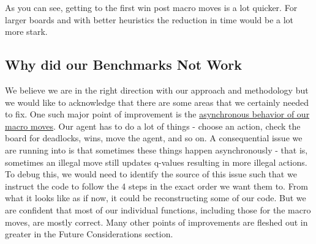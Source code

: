 \documentclass{article}
\begin{document}
As you can see, getting to the first win post macro moves is a lot quicker. For larger boards and with better heuristics the reduction in time would be a lot more stark. 

\subsection{Why did our Benchmarks Not Work}

We believe we are in the right direction with our approach and methodology but we would like to acknowledge that there are some areas that we certainly needed to fix. One such major point of improvement is the \underline{asynchronous behavior of our macro moves}. Our agent has to do a lot of things - choose an action, check the board for deadlocks, wins, move the agent, and so on. A consequential issue we are running into is that sometimes these things happen asynchronously - that is, sometimes an illegal move still updates q-values resulting in more illegal actions. To debug this, we would need to identify the source of this issue such that we instruct the code to follow the 4 steps in the exact order we want them to. From what it looks like as if now, it could be reconstructing some of our code. But we are confident that most of our individual functions, including those for the macro moves, are mostly correct. Many other points of improvements are fleshed out in greater in the Future Considerations section. 






\end{document}
